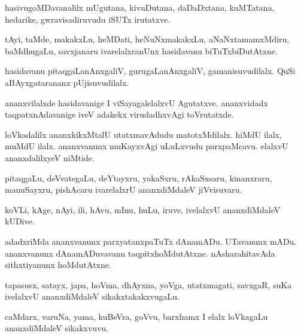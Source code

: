 \documentclass{article}
\begin{document}
\begin{mn}
hasivugoMDavanalilx  mUgutana,  kivuDutana,  daDaDxtana,  kuMTatana,  hedarike,  
gwravisadiruvudu  iSUTx  irutatxve. 
\end{mn}

\begin{mn}
tAyi,  taMde, makakxLu,  heMDati,  heNuNxmakakxLu,  aNaNxtamamxMdiru,  baMdhugaLu,  
savxjanaru  ivarelalxranUnx  hasidavanu  biTuTxbiDutAtxne.
\end{mn}

\begin{mn}
hasidavanu  pitaqgaLanAnxgaliV,  gurugaLanAnxgaliV,  gamanisuvudilalx.  QuSi  
aBAyxgatarananx  pUjisuvudilalx.
\end{mn}

\begin{mn}
ananxvilalxde hasidavanige  I  viSayagalelalxvU  Agutatxve.  ananxvidadx  taqpatxnAdavanige  
iveV  adakekx  virudadhxvAgi  toVrutatxde.
\end{mn}

\begin{mn}
loVkadalilx  ananxkikxMtalU  utatxmavAdudu  matotxMdilalx.  hiMdU  ilalx, muMdU  ilalx.  
ananxvanunx  muKayxvAgi  uLuLxvudu  parxpaMcavu.  elalxvU  ananxdalilxyeV  niMtide.
\end{mn}

\begin{mn}
pitaqgaLu,  deVvategaLu,  deYtayxru,  yakaSxru,  rAkaSxsaru,  kinanxraru,  manuSayxru,  
pishAcaru  ivarelalxrU  ananxdiMdaleV  jiVvisuvaru.
\end{mn}

\begin{mn}
koVLi,  kAge,  nAyi,  ili,  hAvu,  mInu,  huLu,  iruve,  ivelalxvU  ananxdiMdaleV  kUDive.
\end{mn}

\begin{mn}
adadxriMda  ananxvanunx  parxyatanxpaTuTx  dAnamADu.  UTavanunx  mADu.  ananxvanunx  
dAnamADuvavanu  taqpitxhoMdutAtxne.  nAsharahitavAda  sithxtiyanunx  hoMdutAtxne.
\end{mn}

\begin{mn}
tapasusx,  satayx,  japa,  hoVma,  dhAyxna,  yoVga,  utatxmagati,  savxgaR,  suKa  
ivelalxvU  ananxdiMdaleV  sikakxtakakxvugaLu.
\end{mn}

\begin{mn}
caMdarx,  varuNa,  yama,  kuBeVra,  goVvu,  barxhamx  I  elalx  loVkagaLu  ananxdiMdaleV  sikakxvuvu.
\end{mn}
\end{document}

